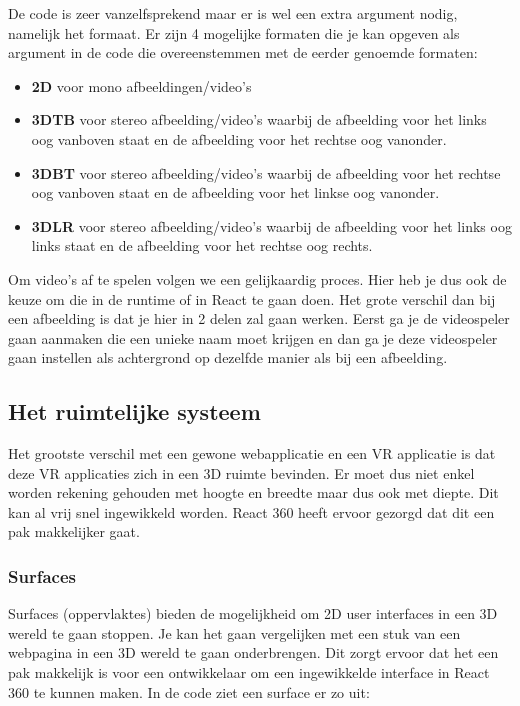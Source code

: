 De code is zeer vanzelfsprekend maar er is wel een extra argument nodig, namelijk het formaat. Er zijn 4 mogelijke formaten die je kan opgeven als argument in de code die overeenstemmen met de eerder genoemde formaten:

\begin{itemize}
	\item \textbf{2D} voor mono afbeeldingen/video's 
	\item \textbf{3DTB} voor stereo afbeelding/video's waarbij de afbeelding voor het links oog vanboven staat en de afbeelding voor het rechtse oog vanonder.
	\item \textbf{3DBT} voor stereo afbeelding/video's waarbij de afbeelding voor het rechtse oog vanboven staat en de afbeelding voor het linkse oog vanonder.
	\item \textbf{3DLR} voor stereo afbeelding/video's waarbij de afbeelding voor het links oog links staat en de afbeelding voor het rechtse oog rechts.
\end{itemize}

Om video's af te spelen volgen we een gelijkaardig proces. Hier heb je dus ook de keuze om die in de runtime of in React te gaan doen. Het grote verschil dan bij een afbeelding is dat je hier in 2 delen zal gaan werken. Eerst ga je de videospeler gaan aanmaken die een unieke naam moet krijgen en dan ga je deze videospeler gaan instellen als achtergrond op dezelfde manier als bij een afbeelding.

\subsection{Het ruimtelijke systeem}
\label{subsec:ruimtelijk-systeem}
Het grootste verschil met een gewone webapplicatie en een VR applicatie is dat deze VR applicaties zich in een 3D ruimte bevinden. Er moet dus niet enkel worden rekening gehouden met hoogte en breedte maar dus ook met diepte. Dit kan al vrij snel ingewikkeld worden. React 360 heeft ervoor gezorgd dat dit een pak makkelijker gaat.

\subsubsection{Surfaces}
\label{ssubsec:surfaces}
Surfaces (oppervlaktes) bieden de mogelijkheid om 2D user interfaces in een 3D wereld te gaan stoppen. Je kan het gaan vergelijken met een stuk van een webpagina in een 3D wereld te gaan onderbrengen. Dit zorgt ervoor dat het een pak makkelijk is voor een ontwikkelaar om een ingewikkelde interface in React 360 te kunnen maken. In de code ziet een surface er zo uit:

